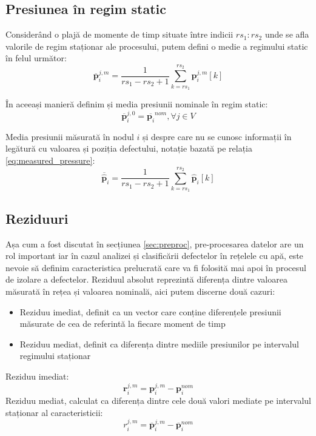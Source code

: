 \subsection{Presiunea în regim static}
Considerând o plajă de momente de timp situate între indicii $rs_1 : rs_2$ unde se afla valorile de regim staționar ale procesului, putem defini o medie a regimului static în felul următor:
\begin{equation}
\overline{\mathbf{p}}_i^{j,m} = \frac{1}{rs_1 - rs_2 + 1} \sum_{k=rs_1}^{rs_2} \mathbf{p}_i^{j,m}[k] 
\label{eq:pmean}
\end{equation}

În aceeași manieră definim și media presiunii nominale în regim static:
\begin{equation}
\overline{\mathbf{p}}_i^{j,0} = \overline{\mathbf{p}_i}^{nom}, \forall j \in V
\label{eq:pmean_nom}
\end{equation}

Media presiunii măsurată în nodul $i$ și despre care nu se cunosc informații în legătură cu valoarea și poziția defectului, notație bazată pe relația \eqref{eq:measured_pressure}:
\begin{equation}
\overline{\widehat{\mathbf{p}}}_i = \frac{1}{rs_1 - rs_2 + 1} \sum_{k=rs_1}^{rs_2} \widehat{\mathbf{p}}_i[k] 
\label{eq:pmean_measured}
\end{equation}

\subsection{Reziduuri}
Așa cum a fost discutat în secțiunea \ref{sec:preproc}, pre-procesarea datelor are un rol important iar în cazul analizei și clasificării defectelor în rețelele cu apă, este nevoie să definim caracteristica prelucrată care va fi folosită mai apoi în procesul de izolare a defectelor. Reziduul absolut reprezintă diferența dintre valoarea măsurată în rețea și valoarea nominală, aici putem discerne două cazuri:

\begin{itemize}
    \item Reziduu imediat, definit ca un vector care conține diferențele presiunii măsurate de cea de referintă la fiecare moment de timp
    \item Reziduu mediat, definit ca diferența dintre mediile presiunilor pe intervalul regimului staționar
\end{itemize}

Reziduu imediat:
\begin{equation}
\mathbf{r}_i^{j,m} = \mathbf{p}_i^{j,m} - \mathbf{p}_i^{nom}
\label{eq:temp_residual}
\end{equation}
Reziduu mediat, calculat ca diferența dintre cele două valori mediate pe intervalul staționar al caracteristicii:
\begin{equation}
r_i^{j,m} = \overline{\mathbf{p}}_i^{j,m} - \overline{\mathbf{p}}_i^{nom}
\label{eq:absolute_residual}
\end{equation}

